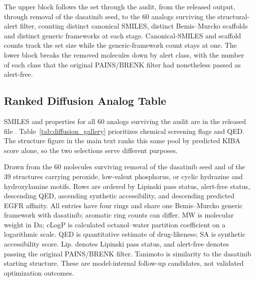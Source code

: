 \documentclass[11pt]{article}
\newenvironment{smalltable}%
{\begin{table}[!htbp]\centering\begingroup\setlength{\tabcolsep}{3pt}\renewcommand{\arraystretch}{1.1}\footnotesize}%
{\endgroup\end{table}}
\begin{document}
\begin{smalltable}
\caption{\textbf{Structural audit of the 100 released diffusion analogs.}}
\label{tab:generated_audit_s}
\par\vspace{3pt}
\begin{minipage}{\linewidth}\footnotesize\raggedright
The upper block follows the set through the audit, from the released output, through removal of the dasatinib seed, to the 60 analogs surviving the structural-alert filter, counting distinct canonical SMILES, distinct Bemis--Murcko scaffolds and distinct generic frameworks at each stage. Canonical-SMILES and scaffold counts track the set size while the generic-framework count stays at one. The lower block breaks the removed molecules down by alert class, with the number of each class that the original PAINS/BRENK filter had nonetheless passed as alert-free.
\end{minipage}
\end{smalltable}

\subsection{Ranked Diffusion Analog Table}
SMILES and properties for all 60 analogs surviving the audit are in the released file .
Table~\ref{tab:diffusion_gallery} prioritizes chemical screening flags and QED.
The structure figure in the main text ranks this same pool by predicted KIBA
score alone, so the two selections serve different purposes.

\begin{smalltable}
\caption{\textbf{Top 10 diffusion analogs ranked by chemical filters and drug-likeness.}}
\label{tab:diffusion_gallery}
\par\vspace{3pt}
\begin{minipage}{\linewidth}\footnotesize\raggedright
Drawn from the 60 molecules surviving removal of the dasatinib seed and of the 39 structures carrying peroxide, low-valent phosphorus, or cyclic hydrazine and hydroxylamine motifs. Rows are ordered by Lipinski pass status, alert-free status, descending QED, ascending synthetic accessibility, and descending predicted EGFR affinity. All entries have four rings and share one Bemis--Murcko generic framework with dasatinib; aromatic ring counts can differ. MW is molecular weight in Da; cLogP is calculated octanol--water partition coefficient on a logarithmic scale. QED is quantitative estimate of drug-likeness; SA is synthetic accessibility score. Lip. denotes Lipinski pass status, and alert-free denotes passing the original PAINS/BRENK filter. Tanimoto is similarity to the dasatinib starting structure. These are model-internal follow-up candidates, not validated optimization outcomes.
\end{minipage}
\end{smalltable}
\end{document}
